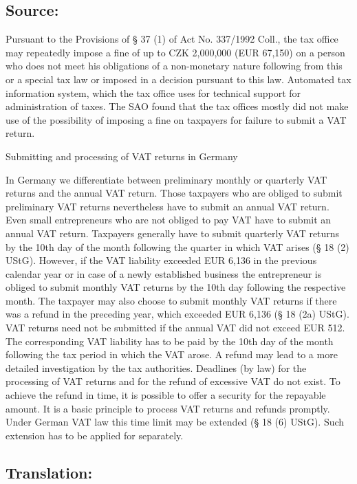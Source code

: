 \documentclass[10pt]{article}
\begin{document}
\subsection*{Source:}

Pursuant to the Provisions of § 37 (1) of Act No. 337/1992 Coll., the tax office may repeatedly impose a fine of up to CZK 2,000,000 (EUR 67,150) on a person who does not meet his obligations of a non-monetary nature following from this or a special tax law or imposed in a decision pursuant to this law.
Automated tax information system, which the tax office uses for technical support for administration of taxes.
The SAO found that the tax offices mostly did not make use of the possibility of imposing a fine on taxpayers for failure to submit a VAT return.


Submitting and processing of VAT returns in Germany

In Germany we differentiate between preliminary monthly or quarterly VAT returns and the annual VAT return.
Those taxpayers who are obliged to submit preliminary VAT returns nevertheless have to submit an annual VAT return.
Even small entrepreneurs who are not obliged to pay VAT have to submit an annual VAT return.
Taxpayers generally have to submit quarterly VAT returns by the 10th day of the month following the quarter in which VAT arises (§ 18 (2) UStG).
However, if the VAT liability exceeded EUR 6,136 in the previous calendar year or in case of a newly established business the entrepreneur is obliged to submit monthly VAT returns by the 10th day following the respective month.
The taxpayer may also choose to submit monthly VAT returns if there was a refund in the preceding year, which exceeded EUR 6,136 (§ 18 (2a) UStG).
VAT returns need not be submitted if the annual VAT did not exceed EUR 512.
The corresponding VAT liability has to be paid by the 10th day of the month following the tax period in which the VAT arose.
A refund may lead to a more detailed investigation by the tax authorities.
Deadlines (by law) for the processing of VAT returns and for the refund of excessive VAT do not exist.
To achieve the refund in time, it is possible to offer a security for the repayable amount.
It is a basic principle to process VAT returns and refunds promptly.
Under German VAT law this time limit may be extended (§ 18 (6) UStG).
Such extension has to be applied for separately.


\pagebreak

\subsection*{Translation:}
\end{document}
